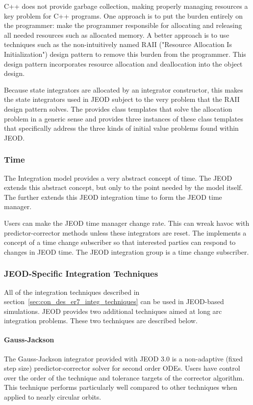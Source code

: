 C++ does not provide garbage collection, making properly managing resources
a key problem for C++ programs. One approach is to put the burden entirely
on the programmer: make the programmer responsible for allocating and
releasing all needed resources such as allocated memory. A better approach
is to use techniques such as the non-intuitively named RAII
("Resource Allocation Is Initialization") design pattern to remove this burden
from the programmer. This design pattern incorporates resource allocation and
deallocation into the object design.

Because state integrators are allocated by an integrator constructor, this makes
the state integrators used in JEOD subject to the very problem that the RAII
design pattern solves. The \ModelDesc provides class templates that solve the
allocation problem in a generic sense and provides three instances of these
class templates that specifically address the three kinds of
initial value problems found within JEOD.

\subsubsection{Time}

The \erseven Integration model provides a very abstract concept of time.
The JEOD \ModelDesc extends this abstract concept, but only to the point needed
by the model itself. The  further extends this JEOD
integration time to form the JEOD time manager.
 
Users can make the JEOD time manager change rate.
This can wreak havoc with predictor-corrector methods unless these integrators
are reset. The \ModelDesc implements a concept of a time change subscriber
so that interested parties can respond to changes in JEOD time. The
JEOD integration group is a time change subscriber.

\subsubsection{JEOD-Specific Integration Techniques}

All of the integration techniques described in
section~\ref{sec:con_des_er7_integ_techniques} can be used in JEOD-based
simulations. JEOD provides two additional techniques aimed at long arc
integration problems. These two techniques are described below.

\paragraph{Gauss-Jackson}
The Gauss-Jackson integrator provided with JEOD 3.0 is a non-adaptive
(fixed step size) predictor-corrector solver for second order ODEs. Users
have control over the order of the technique and tolerance targets of the
corrector algorithm. This technique performs particularly well compared to
other techniques when applied to nearly circular orbits.

